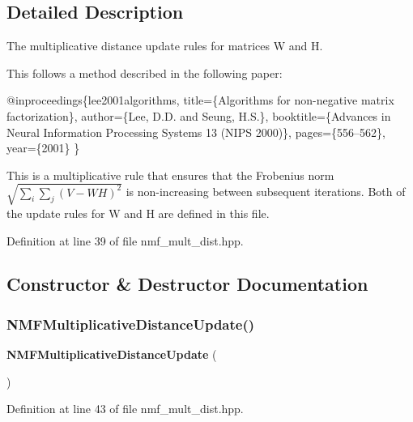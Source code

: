 \subsection{Detailed Description}
The multiplicative distance update rules for matrices W and H. 

This follows a method described in the following paper\+:


\begin{DoxyCode}
@inproceedings\{lee2001algorithms,
  title=\{Algorithms \textcolor{keywordflow}{for} non-negative matrix factorization\},
  author=\{Lee, D.D. and Seung, H.S.\},
  booktitle=\{Advances in Neural Information Processing Systems 13
      (NIPS 2000)\},
  pages=\{556--562\},
  year=\{2001\}
\}
\end{DoxyCode}


This is a multiplicative rule that ensures that the Frobenius norm $ \sqrt{\sum_i \sum_j(V-WH)^2} $ is non-\/increasing between subsequent iterations. Both of the update rules for W and H are defined in this file. 

Definition at line 39 of file nmf\+\_\+mult\+\_\+dist.\+hpp.



\subsection{Constructor \& Destructor Documentation}
\mbox{\label{classmlpack_1_1amf_1_1NMFMultiplicativeDistanceUpdate_ab617f348654db931f85c1c60066d8f4d}} 
\subsubsection{N\+M\+F\+Multiplicative\+Distance\+Update()}
{\footnotesize\ttfamily \textbf{ N\+M\+F\+Multiplicative\+Distance\+Update} (\begin{DoxyParamCaption}{ }\end{DoxyParamCaption})\hspace{0.3cm}{\ttfamily [inline]}}



Definition at line 43 of file nmf\+\_\+mult\+\_\+dist.\+hpp.



